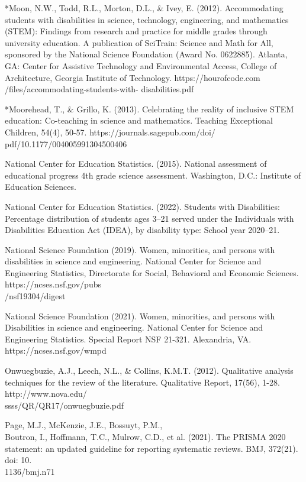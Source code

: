 \documentclass[11pt]{sig-alternate}
\begin{document}
\begin{large}
*Moon, N.W., Todd, R.L., Morton, D.L., \& Ivey, E. (2012). Accommodating students with disabilities in science, technology, engineering, and mathematics (STEM): Findings from research and practice for middle grades through university education. A publication of SciTrain: Science and Math for All, sponsored by the National Science Foundation (Award No. 0622885). Atlanta, GA: Center for Assistive Technology and Environmental Access, College of Architecture, Georgia Institute of Technology. https://hourofcode.com /files/accommodating-students-with- disabilities.pdf

*Moorehead, T., \& Grillo, K. (2013). Celebrating the reality of inclusive STEM education: Co-teaching in science and mathematics. Teaching Exceptional Children, 54(4), 50-57.
	https://journals.sagepub.com/doi/ \\pdf/10.1177/004005991304500406

National Center for Education Statistics. (2015). National assessment of educational progress 4th grade science assessment. Washington, D.C.: Institute of Education Sciences.

National Center for Education Statistics. (2022). Students with Disabilities: Percentage distribution of students ages 3–21 served under the Individuals with Disabilities Education Act (IDEA), by disability type: School year 2020–21. 

National Science Foundation (2019). Women, minorities, and persons with disabilities in science and engineering. National Center for Science and Engineering Statistics, Directorate for Social, Behavioral and Economic Sciences. https://ncses.nsf.gov/pubs\\/nsf19304/digest

National Science Foundation (2021). Women, minorities, and persons with Disabilities in science and engineering. National Center for Science and Engineering Statistics. Special Report NSF 21-321. Alexandria, VA. https://ncses.nsf.gov/wmpd

Onwuegbuzie, A.J., Leech, N.L., \& Collins, K.M.T. (2012). Qualitative analysis techniques for the review of the literature. Qualitative Report, 17(56), 1-28. http://www.nova.edu/\\ssss/QR/QR17/onwuegbuzie.pdf

Page, M.J., McKenzie, J.E., Bossuyt, P.M., \\Boutron, I., Hoffmann, T.C., Mulrow, C.D., et al. (2021). The PRISMA 2020 statement: an updated guideline for reporting systematic reviews. BMJ, 372(21). doi: 10.\\1136/bmj.n71


\end{large}
\end{document}
